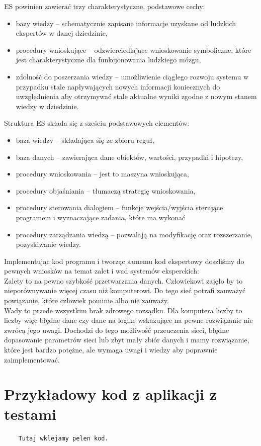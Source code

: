 \documentclass[12pt,a4paper]{article}
\begin{document}
	ES powinien zawierać trzy charakterystyczne, podstawowe cechy:
	\begin{itemize}
		\item bazy wiedzy -- schematycznie zapisane informacje uzyskane od ludzkich ekspertów w danej dziedzinie,
		\item procedury wnioskujące -- odzwierciedlające wnioskowanie symboliczne, które jest charakterystyczne dla funkcjonowania ludzkiego mózgu,
		\item zdolność do poszerzania wiedzy -- umożliwienie ciągłego rozwoju systemu w przypadku stale napływających nowych informacji koniecznych do uwzględnienia aby otrzymywać stale aktualne wyniki zgodne z nowym stanem wiedzy w dziedzinie.
	\end{itemize}
	\bigskip
	
	Struktura ES składa się z sześciu podstawowych elementów:
	\begin{itemize}
		\item baza wiedzy -- składająca się ze zbioru reguł,
		\item baza danych -- zawierająca dane obiektów, wartości, przypadki i hipotezy,
		\item procedury wnioskowania -- jest to maszyna wnioskująca,
		\item procedury objaśniania -- tłumaczą strategię wnioskowania,
		\item procedury sterowania dialogiem -- funkcje wejścia/wyjścia sterujące programem i wyznaczające zadania, które ma wykonać
		\item procedury zarządzania wiedzą -- pozwalają na modyfikację oraz rozszerzanie, pozyskiwanie wiedzy.
	\end{itemize}
	
	
	
	
	Implementując kod programu i tworząc samemu kod ekspertowy doszliśmy do pewnych wniosków na temat zalet i wad systemów eksperckich:\\
	Zalety to na pewno szybkość przetwarzania danych. Człowiekowi zajęło by to nieporównywanie więcej czasu niż komputerowi. Do tego sieć potrafi zauważyć powiązanie, które człowiek pominie albo nie zauważy.\\
	Wady to przede wszystkim brak zdrowego rozsądku. Dla komputera liczby to liczby więc błędne dane czy dane na logikę wskazujące na pewne rozwiązanie nie zwrócą jego uwagi. Dochodzi do tego możliwość przeuczenia sieci, błędne dopasowanie parametrów sieci lub zbyt mały zbiór danych i mamy rozwiązanie, które jest bardzo potężne, ale wymaga uwagi i wiedzy aby poprawnie zaimplementować.
	
	

\section*{Przykładowy kod z aplikacji z testami}


\begin{lstlisting}
	Tutaj wklejamy pelen kod. 
\end{lstlisting}
\end{document}
